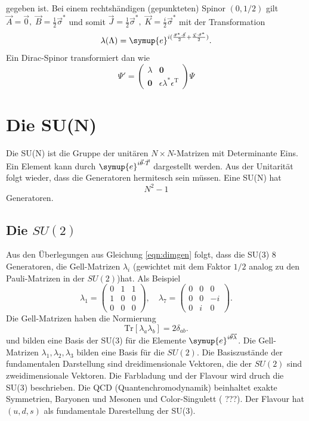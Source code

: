 \documentclass[
  captions=tableheading,  %
  titlepage=firstiscover, %
]{scrartcl}
\begin{document}
gegeben ist.
Bei einem rechtshändigen (gepunkteten) Spinor $(0, 1/2)$ gilt
$\vec{A} = \vec{0}, \; \vec{B} = \frac{1}{2}\vec{\sigma}^*$ und somit 
$\vec{J} =\frac{1}{2}\vec{\sigma}^*, \; \vec{K} = \frac{i}{2}\vec{\sigma}^*$ 
mit der Transformation 
\begin{equation*}
  \lambda(\Lambda) = \symup{e}^{i(\frac{\vec{\sigma}^* \cdot \vec{\theta}}{2} + \frac{\vec{\chi} \cdot \vec{\sigma}^*}{2})}.
\end{equation*}
Ein Dirac-Spinor transformiert dan wie 
\begin{equation*}
  \Psi' = 
  \begin{pmatrix}
    \lambda & \mathbf{0} \\ 
    \mathbf{0}       & \epsilon \lambda^* \epsilon^{\text{T}}
  \end{pmatrix}
  \Psi
\end{equation*}
\section{Die SU(N)}
Die SU(N) ist die Gruppe der unitären $N \times N$-Matrizen mit Determinante Eins. 
Ein Element kann durch $\symup{e}^{i\vec{\theta} \cdot \vec{{T}}}$ dargestellt werden.
Aus der Unitarität folgt wieder, dass die Generatoren hermitesch sein müssen.
Eine SU(N) hat
\begin{equation}
  N^2 - 1 \label{eqn:dimgen}
\end{equation}
Generatoren.
\subsection{Die \texorpdfstring{$SU(2)$}{PDFstring}}
Aus den Überlegungen aus Gleichung \eqref{eqn:dimgen} folgt, dass die 
SU(3) 8 Generatoren, die Gell-Matrizen $\lambda_i$ (gewichtet mit dem Faktor $1/2$ analog 
zu den Pauli-Matrizen in der $SU(2)$)hat.
Als Beispiel
\begin{equation*}
  \lambda_1 = 
  \begin{pmatrix}
    0 & 1 & 1 \\
    1 & 0 & 0 \\ 
    0 & 0 & 0 
  \end{pmatrix} ,\quad 
  \lambda_7 = 
  \begin{pmatrix}
    0 & 0 & 0 \\
    0 & 0 & -i\\
    0 & i & 0
  \end{pmatrix}.
\end{equation*}
Die Gell-Matrizen haben die Normierung 
\begin{equation*}
  \text{Tr}[\lambda_a \lambda_b] = 2 \delta_{ab} .
\end{equation*}
und bilden eine Basis der SU(3) für die Elemente $\symup{e}^{i \vec{\theta} \vec{\lambda}}$.
Die Gell-Matrizen $\lambda_1, \lambda_2, \lambda_3$ bilden eine Basis für 
die $SU(2)$.
Die Basiszustände der fundamentalen Darstellung sind dreidimensionale Vektoren, die der $SU(2)$ sind 
zweidimensionale Vektoren.
Die Farbladung und der Flavour wird druch die SU(3) beschrieben.
Die QCD (Quantenchromodynamik) beinhaltet exakte Symmetrien, Baryonen und Mesonen und Color-Singulett ({\color{red} ???}).
Der Flavour hat $(u, d, s)$ als fundamentale Darestellung der SU(3).
\end{document}
